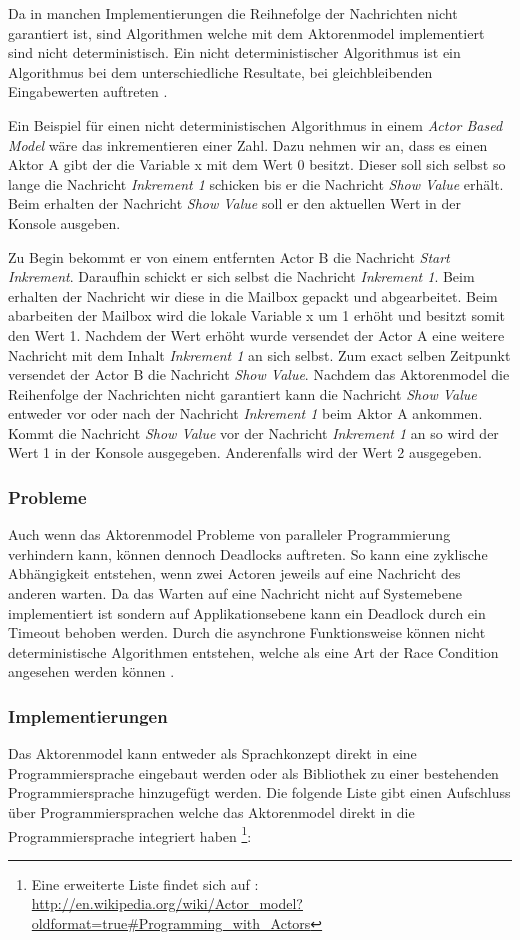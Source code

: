 Da in manchen Implementierungen die Reihnefolge der Nachrichten nicht garantiert ist, sind Algorithmen welche mit dem Aktorenmodel implementiert sind nicht deterministisch. Ein nicht deterministischer Algorithmus ist ein Algorithmus bei dem unterschiedliche Resultate, bei gleichbleibenden Eingabewerten auftreten \cite[]{Agh85}. 

Ein Beispiel für einen nicht deterministischen Algorithmus in einem \emph{Actor Based Model} wäre das  inkrementieren einer Zahl. Dazu nehmen wir an, dass es einen Aktor A gibt der die Variable x mit dem Wert 0 besitzt. Dieser soll sich selbst so lange die Nachricht \emph{Inkrement 1} schicken bis er die Nachricht \emph{Show Value} erhält. Beim erhalten der Nachricht \emph{Show Value} soll er den aktuellen Wert in der Konsole ausgeben.

Zu Begin bekommt er von einem entfernten Actor B die Nachricht \emph{Start Inkrement}. Daraufhin schickt er sich selbst die Nachricht \emph{Inkrement 1}. Beim erhalten der Nachricht wir diese in die Mailbox gepackt und abgearbeitet. Beim abarbeiten der Mailbox wird die lokale Variable x um 1 erhöht und besitzt somit den Wert 1. Nachdem der Wert erhöht wurde versendet der Actor A eine weitere Nachricht mit dem Inhalt \emph{Inkrement 1} an sich selbst. Zum exact selben Zeitpunkt versendet der Actor B die Nachricht \emph{Show Value}. Nachdem das Aktorenmodel  die Reihenfolge der Nachrichten nicht garantiert kann die Nachricht \emph{Show Value} entweder vor oder nach der Nachricht \emph{Inkrement 1} beim Aktor A ankommen. Kommt die Nachricht \emph{Show Value} vor der Nachricht \emph{Inkrement 1} an so wird der Wert 1 in der Konsole ausgegeben. Anderenfalls wird der Wert 2 ausgegeben.

\subsubsection{Probleme}
Auch wenn das Aktorenmodel Probleme von paralleler Programmierung verhindern kann, können dennoch Deadlocks auftreten. So kann eine zyklische Abhängigkeit entstehen, wenn zwei Actoren jeweils auf eine Nachricht des anderen warten. Da das Warten auf eine Nachricht nicht auf Systemebene implementiert ist sondern auf Applikationsebene kann ein Deadlock durch ein Timeout behoben werden. Durch die asynchrone Funktionsweise können nicht deterministische Algorithmen entstehen, welche als eine Art der Race Condition angesehen werden können \cite[p. 86]{Erb2012}.

\subsubsection{Implementierungen}
Das Aktorenmodel kann entweder als Sprachkonzept direkt in eine Programmiersprache eingebaut werden oder als Bibliothek zu einer bestehenden Programmiersprache hinzugefügt werden. Die folgende Liste gibt einen Aufschluss über Programmiersprachen welche das Aktorenmodel direkt in die Programmiersprache integriert haben \footnote{Eine erweiterte Liste findet sich auf  \cite[p. 86]{Erb2012}: \url{http://en.wikipedia.org/wiki/Actor_model?oldformat=true#Programming_with_Actors}}:

